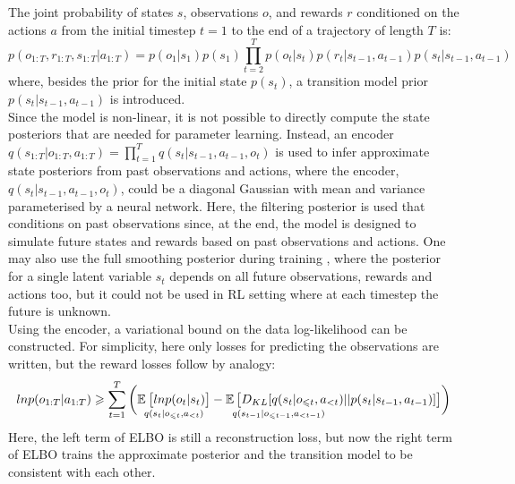 The joint probability of states $s$, observations $o$, and rewards $r$ conditioned on the actions $a$ from the initial timestep $t = 1$ to the end of a trajectory of length $T$ is:
$$p(o_{1:T}, r_{1:T}, s_{1:T} | a_{1:T}) = p(o_1|s_1)p(s_1) \prod^T_{t=2} p(o_t|s_t)p(r_t|s_{t-1}, a_{t-1})p(s_t|s_{t−1}, a_{t−1})$$
where, besides the prior for the initial state $p(s_t)$, a transition model prior $p(s_t|s_{t−1}, a_{t−1})$ is introduced. \\
Since the model is non-linear, it is not possible to directly compute the state posteriors that are needed for parameter learning. Instead, an encoder $q(s_{1:T} | o_{1:T}, a_{1:T}) = \prod^T_{t=1} q(s_t | s_{t−1}, a_{t−1}, o_t)$ is used to infer approximate state posteriors from past observations and actions, where the encoder, $q(s_t | s_{t−1}, a_{t−1}, o_t)$, could be a diagonal Gaussian with mean and variance parameterised by a neural network. Here, the filtering posterior \cite{Algo.Filtering} is used that conditions on past observations since, at the end, the model is designed to simulate future states and rewards based on past observations and actions. One may also use the full smoothing posterior during training \cite{Algo.Smoothing}, where the posterior for a single latent variable $s_t$ depends on all future observations, rewards and actions too, but it could not be used in RL setting where at each timestep the future is unknown. \\
Using the encoder, a variational bound on the data log-likelihood can be constructed. For simplicity, here only losses for predicting the observations are written, but the reward losses follow by analogy:
$$ln p(o_{1:T} | a_{1:T}) \geqslant \sum^T_{t=1} \bigg( \underset{q(s_t|o_{\leqslant t}, a_{<t})}{\operatorname{\mathbb{E}}_{} \big[ ln p(o_t|s_t) \big]} - \underset{q(s_{t-1}|o_{\leqslant t-1}, a_{<t-1})\hphantom{offset==to=====left}}{\operatorname{\mathbb{E}} \big[ D_{KL}[q(s_t|o_{\leqslant t}, a_{<t})||p(s_t|s_{t-1}, a_{t-1})] \big]} \bigg)$$
Here, the left term of ELBO is still a reconstruction loss, but now the right term of ELBO trains the approximate posterior and the transition model to be consistent with each other.

